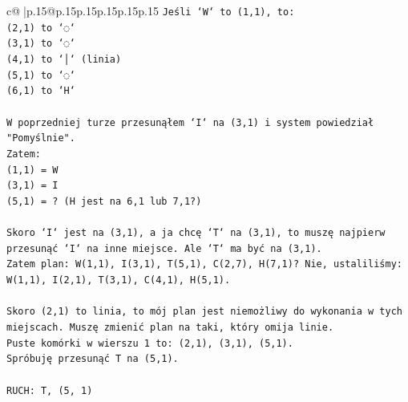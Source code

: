 \documentclass{article}
\begin{document}
{\begin{supertabular}{c@{$\;$}|p{.15\linewidth}@{}p{.15\linewidth}p{.15\linewidth}p{.15\linewidth}p{.15\linewidth}p{.15\linewidth}}
{{{\texttt{Jeśli `W` to (1,1), to:} \\
\texttt{(2,1) to `◌`} \\
\texttt{(3,1) to `◌`} \\
\texttt{(4,1) to `│` (linia)} \\
\texttt{(5,1) to `◌`} \\
\texttt{(6,1) to `H`} \\
\\ 
\texttt{W poprzedniej turze przesunąłem `I` na (3,1) i system powiedział "Pomyślnie".} \\
\texttt{Zatem:} \\
\texttt{(1,1) = W} \\
\texttt{(3,1) = I} \\
\texttt{(5,1) = ? (H jest na 6,1 lub 7,1?)} \\
\\ 
\texttt{Skoro `I` jest na (3,1), a ja chcę `T` na (3,1), to muszę najpierw przesunąć `I` na inne miejsce. Ale `T` ma być na (3,1).} \\
\texttt{Zatem plan: W(1,1), I(3,1), T(5,1), C(2,7), H(7,1)? Nie, ustaliliśmy: W(1,1), I(2,1), T(3,1), C(4,1), H(5,1).} \\
\\ 
\texttt{Skoro (2,1) to linia, to mój plan jest niemożliwy do wykonania w tych miejscach. Muszę zmienić plan na taki, który omija linie.} \\
\texttt{Puste komórki w wierszu 1 to: (2,1), (3,1), (5,1).} \\
\texttt{Spróbuję przesunąć T na (5,1).} \\
\\ 
\texttt{RUCH: T, (5, 1)} \\
            }
        }
    }
     \\ \\


\end{supertabular}}
\end{document}
